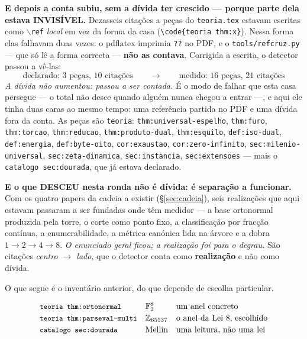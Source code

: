 \documentclass[11pt,a4paper]{article}
\newcommand{\code}[1]{\texttt{\small #1}}
\newcommand{\leitura}[1]{\code{#1}}
\begin{document}
\medskip
\noindent\textbf{E depois a conta subiu, sem a dívida ter crescido --- porque parte dela
estava INVISÍVEL.} Dezasseis citações a peças do \code{teoria.tex} estavam escritas como
$\backslash$\code{ref} \emph{local} em vez da forma da casa
(\code{\textbackslash code\{teoria thm:x\}}). Nessa forma elas falhavam duas vezes: o
pdflatex imprimia \code{??} no PDF, e o \code{tools/refcruz.py} --- que só lê a forma
correcta --- \textbf{não as contava}. Corrigida a escrita, o detector passou a vê-las:
\[
\boxed{\;\text{declarado: }3\text{ peças, }10\text{ citações}
\qquad\longrightarrow\qquad
\text{medido: }16\text{ peças, }21\text{ citações}\;}
\]
\emph{A dívida não aumentou: passou a ser contada.} É o modo de falhar que esta casa
persegue --- o total não desce quando alguém nunca chegou a entrar ---, e aqui ele tinha
duas caras ao mesmo tempo: uma referência partida no PDF e uma dívida fora da conta.
As peças são \code{teoria}: \code{thm:universal-espelho}, \code{thm:furo},
\code{thm:torcao}, \code{thm:reducao}, \code{thm:produto-dual}, \code{thm:esquilo},
\code{def:iso-dual}, \code{def:energia}, \code{def:byte-oito}, \code{cor:exaustao},
\code{cor:zero-infinito}, \code{sec:milenio-universal}, \code{sec:zeta-dinamica},
\code{sec:instancia}, \code{sec:extensoes} --- mais o \leitura{catalogo sec:dourada}, que já
estava declarado.

\medskip
\noindent\textbf{E o que DESCEU nesta ronda não é dívida: é separação a funcionar.} Com os
quatro papers da cadeia a existir (\S\ref{sec:cadeia}), seis realizações que aqui estavam
passaram a ser fundadas onde têm medidor --- a base ortonormal produzida pela torre, o
corte como ponto fixo, a classificação por fracção contínua, a enumerabilidade, a métrica
canónica lida na árvore e a dobra $1\to2\to4\to8$. \emph{O enunciado geral ficou; a
realização foi para o degrau.} São citações \emph{centro $\to$ lado}, que o detector conta
como \textbf{realização} e não como dívida.

\medskip
\noindent O que segue é o inventário anterior, do que depende de escolha particular.

\[
\begin{array}{lll}
\code{teoria thm:ortonormal} & \mathbb{F}_2^{8} & \text{um anel concreto}\\[2pt]
\code{teoria thm:parseval-multi} & \mathbb{Z}_{65537} & \text{o anel da Lei 8, escolhido}\\[2pt]
\leitura{catalogo sec:dourada} & \text{Mellin} & \text{uma leitura, não uma lei}
\end{array}
\]
\end{document}
